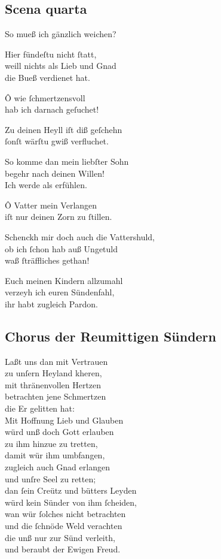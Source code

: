 \documentclass{ees}
\newenvironment{lyrics}[1]{%
  \subsection{#1}\nopagebreak%
  \begin{lyricslist}%
  \let\voice\item%
}{%
  \end{lyricslist}%
}
\newcommand\voiceSohn{\voice[Sohn]}
\newcommand\voiceGehorsame{\voice[Geh. Sohn]}
\newcommand\voiceBarmherzigkeit{\voice[Barmh.]}
\newcommand\voiceGerechtigkeit{\voice[Gerecht.]}
\newcommand\voiceVater{\voice[Vatter]}
\begin{document}
\begin{lyrics}{Scena quarta}
  \voiceGerechtigkeit
  So mueß ich gänzlich weichen?

  \voiceBarmherzigkeit
  Hier fündeſtu nicht ſtatt,\\
  weill nichts als Lieb und Gnad\\
  die Bueß verdienet hat.

  \voiceSohn
  Ô wie ſchmertzensvoll\\
  hab ich darnach geſuchet!

  \voiceGerechtigkeit
  Zu deinen Heyll iſt diß geſchehn\\
  ſonſt wärſtu gwiß verfluchet.

  \voiceVater
  So komme dan mein liebſter Sohn\\
  begehr nach deinen Willen!\\
  Ich werde als erfühlen.

  \voiceSohn
  Ô Vatter mein Verlangen\\
  iſt nur deinen Zorn zu ſtillen.

  \voiceGehorsame
  Schenckh mir doch auch die Vattershuld,\\
  ob ich ſchon hab auß Ungetuld\\
  waß ſträffliches gethan!

  \voiceVater
  Euch meinen Kindern allzumahl\\
  verzeyh ich euren Sündenfahl,\\
  ihr habt zugleich Pardon.
\end{lyrics}

\begin{lyrics}{Chorus der Reumittigen Sündern}
  \voice[Chorus]
  Laßt uns dan mit Vertrauen\\
  zu unſern Heyland kheren,\\
  mit thränenvollen Hertzen\\
  betrachten jene Schmertzen\\
  die Er gelitten hat:\\[1ex]
  Mit Hoffnung Lieb und Glauben\\
  würd unß doch Gott erlauben\\
  zu ihm hinzue zu tretten,\\
  damit wür ihm umbfangen,\\
  zugleich auch Gnad erlangen\\
  und unſre Seel zu retten;\\[1ex]
  dan ſein Creütz und bütters Leyden\\
  würd kein Sünder von ihm ſcheiden,\\
  wan wür ſolches nicht betrachten\\
  und die ſchnöde Weld verachten\\
  die unß nur zur Sünd verleith,\\
  und beraubt der Ewigen Freud.
\end{lyrics}
\end{document}

